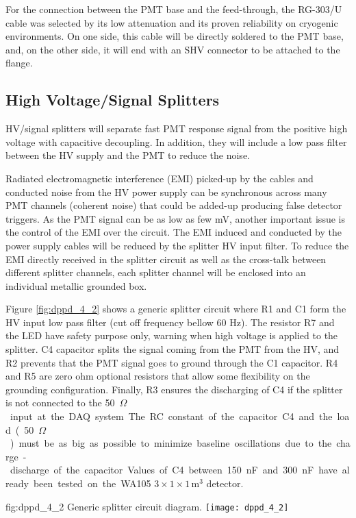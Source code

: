 For the connection between the PMT base and the feed-through, the RG-303/U cable was selected by its low attenuation and its proven reliability on cryogenic environments. On one side, this cable will be directly soldered to the PMT base, and, on the other side, it will end with an SHV connector to be attached to the flange. 

\subsection{High Voltage/Signal Splitters}
\label{sec:fddp-pd-4.2}

HV/signal splitters will separate fast PMT response signal from the positive high voltage with capacitive decoupling. In addition, they will include a low pass filter between the HV supply and the PMT to reduce the noise.

Radiated electromagnetic interference (EMI) picked-up by the cables and conducted noise from the HV power supply can be synchronous across many PMT channels (coherent noise) that could be added-up producing false detector triggers. As the PMT signal can be as low as few mV, another important issue is the control of the EMI over the circuit. The EMI induced and conducted by the power supply cables will be reduced by the splitter HV input filter. To reduce the EMI directly received in the splitter circuit as well as the cross-talk between different splitter channels, each splitter channel will be enclosed into an individual metallic grounded box.

Figure \ref{fig:dppd_4_2} shows a generic splitter circuit where R1 and C1 form the HV input low pass filter (cut off frequency bellow 60 Hz). The resistor R7 and the LED have safety purpose only, warning when high voltage is applied to the splitter. C4 capacitor splits the signal coming from the PMT from the HV, and R2 prevents that the PMT signal goes to ground through the C1 capacitor. R4 and R5 are zero ohm optional resistors that allow some flexibility on the grounding configuration. Finally, R3 ensures the discharging of C4 if the splitter is not connected to the \SI{50}{$\Omega$} input at the DAQ system. The RC constant of the capacitor C4 and the load (\SI{50}{$\Omega$}) must be as big as possible to minimize baseline oscillations due to the charge-discharge of the capacitor. Values of C4 between \SI{150}{nF} and \SI{300}{nF} have already been tested on the WA105 $3\times1\times1$\,m$^3$ detector.

\begin{dunefigure}{fig:dppd_4_2}
{Generic splitter circuit diagram.}
\texttt{[image: dppd\_4\_2]}
\end{dunefigure}

